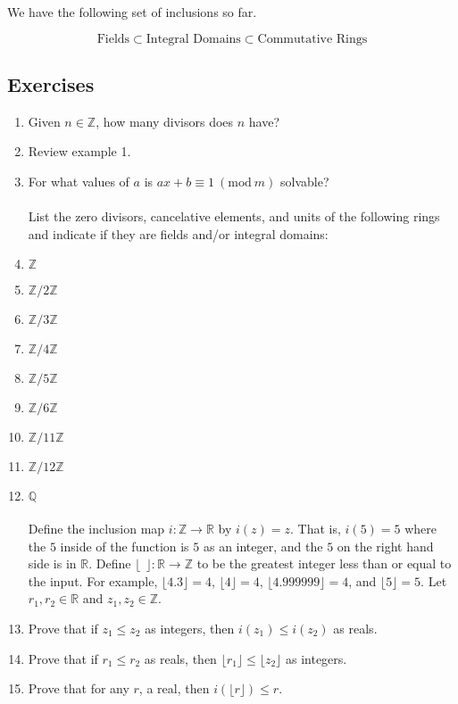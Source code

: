 \documentclass{article}
\theoremstyle{problemstyle}
\newcommand{\Mod}[1]{\ (\mathrm{mod}\ #1)}
\begin{document}
We have the following set of inclusions so far. 

$$\text{Fields} \subset \text{Integral Domains} \subset \text{Commutative Rings}$$

\subsection*{Exercises}

\begin{enumerate}
\item Given $n \in \mathbb{Z}$, how many divisors does $n$ have?
\item Review example 1. 
\item For what values of $a$ is $ax + b \equiv 1 \Mod{m}$ solvable? \\\\
List the zero divisors, cancelative elements, and units of the following rings and indicate if they are fields and/or integral domains:
\item $\mathbb{Z}$
\item $\mathbb{Z}/2\mathbb{Z}$
\item $\mathbb{Z}/3\mathbb{Z}$
\item $\mathbb{Z}/4\mathbb{Z}$
\item $\mathbb{Z}/5\mathbb{Z}$
\item $\mathbb{Z}/6\mathbb{Z}$
\item $\mathbb{Z}/11\mathbb{Z}$
\item $\mathbb{Z}/12\mathbb{Z}$
\item $\mathbb{Q}$ \\ \\
Define the inclusion map $i:\mathbb{Z} \rightarrow \mathbb{R}$ by $i(z) = z$. That is, $i(5) = 5$ where the $5$ inside of the function is $5$ as an integer, and the $5$ on the right hand side is in $\mathbb{R}$. Define $\lfloor \ \ \rfloor:\mathbb{R} \rightarrow \mathbb{Z}$ to be the greatest integer less than or equal to the input. For example, $\lfloor 4.3 \rfloor = 4$, $\lfloor 4 \rfloor = 4$, $\lfloor 4.999999 \rfloor = 4$, and $\lfloor 5 \rfloor = 5$. Let $r_1,r_2 \in \mathbb{R}$ and $z_1,z_2 \in \mathbb{Z}$. 
\item Prove that if $z_1 \leq z_2$ as integers, then $i(z_1) \leq i(z_2)$ as reals.  
\item Prove that if $r_1 \leq r_2$ as reals, then $\lfloor r_1 \rfloor \leq \lfloor z_2 \rfloor$ as integers.  
\item Prove that for any $r$, a real, then $i(\lfloor r \rfloor) \leq r$.  

\end{enumerate}
\end{document}
